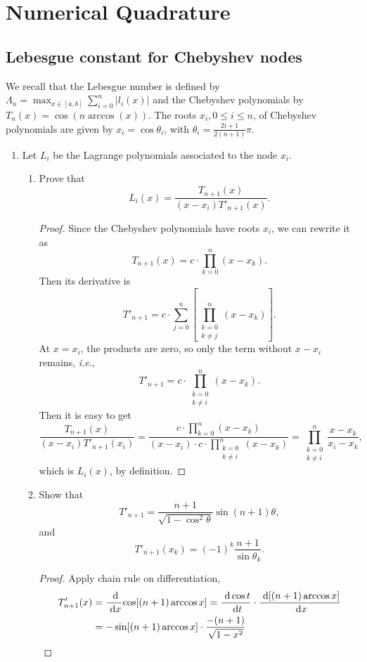 \chapter{Numerical Quadrature}

\section{Lebesgue constant for Chebyshev nodes}
We recall that the Lebesgue number is defined by \(\Lambda_n=\max_{x\in[a,b]}\sum_{i=0}^{n}|l_i(x)|\) and the Chebyshev polynomials by \(T_n(x)=\cos(n\arccos(x))\).
The roots \(x_i,0\leq i\leq n\), of Chebyshev polynomials are given by \(x_i=\cos\theta_i\), with \(\theta_i=\frac{2i+1}{2(n+1)}\pi\).
\begin{enumerate}
	\item Let $L_i$ be the Lagrange polynomials associated to the node $x_i$.
	\begin{enumerate}
		\item Prove that
		\[ L_i(x)=\frac{T_{n+1}(x)}{(x-x_i)T'_{n+1}(x)}. \]
		\begin{proof}
		Since the Chebyshev polynomials have roots $x_i$, we can rewrite it as
		\[ T_{n+1}(x)=c\cdot\prod_{k=0}^{n}(x-x_k). \]
		Then its derivative is
		\[ T'_{n+1}=c\cdot\sum_{j=0}^{n}\left[\prod_{\substack{k=0\\k\neq j}}^n(x-x_k) \right]. \]
		At \(x=x_i\), the products are zero, so only the term without \(x-x_i\) remains, \textit{i.e.},
		\[ T'_{n+1}=c\cdot\prod_{\substack{k=0\\k\neq i}}^n(x-x_k). \]
		Then it is easy to get
		\[ \frac{T_{n+1}(x)}{(x-x_i)T'_{n+1}(x_i)}=\frac{c\cdot\prod_{k=0}^n(x-x_k)}{(x-x_i)\cdot c\cdot\prod_{\substack{k=0\\k\neq i}}^n(x-x_k)}=\prod_{\substack{k=0\\k\neq i}}^n\frac{x-x_k}{x_i-x_k}, \]
		which is \(L_i(x)\), by definition.
		\end{proof}
		\item Show that
		\[ T'_{n+1}=\frac{n+1}{\sqrt{1-\cos^2\theta}}\sin(n+1)\theta, \]
		and
		\[ T'_{n+1}(x_k)=(-1)^k\frac{n+1}{\sin\theta_k}. \]
		\begin{proof}
		Apply chain rule on differentiation,
		\begin{align*}
			T'_{n+1}(x)&=\D{}{x}{\cos[(n+1)\arccos x]}=\frac{\ud\cos t}{\ud t}\cdot\frac{\ud[(n+1)\arccos x]}{\ud x}\\
			&=-\sin[(n+1)\arccos x]\cdot\frac{-(n+1)}{\sqrt{1-x^2}}\\

\end{align*}
\end{proof}
\end{enumerate}
\end{enumerate}
